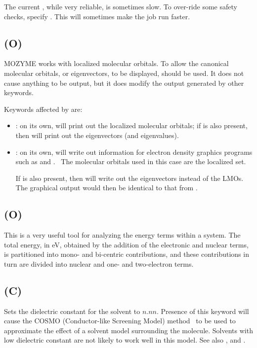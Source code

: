 The current , while very reliable, is sometimes slow.  To over-ride
some safety checks, specify .  This will sometimes make the job run
faster.

\subsection*{ (O)}

MOZYME works with localized molecular orbitals.  To allow the canonical
molecular orbitals, or eigenvectors, to be displayed,  should be
used. It does not cause anything to be output, but it does modify the output
generated by other keywords.

Keywords affected by 
are:
\begin{itemize}
\item {}: on its own,  will print out the localized
molecular orbitals; if  is also present, then 
will print out the eigenvectors (and eigenvalues).
\item  {}: on its own,  will write out information
for electron density graphics programs such as  and . \
The molecular orbitals used in this case are the localized set.

If  is also present, then  will write out the eigenvectors
instead of the LMOs.  The graphical output would then be identical to that
from \comp{MOPAC}.
\end{itemize}

\subsection*{ (O)}
This is a very useful tool for analyzing the energy terms  within  a
system.   The  total  energy,  in  eV,  obtained  by  the addition of the
electronic and nuclear terms, is partitioned into  mono-  and  bi-centric
contributions,  and  these contributions in turn are divided into nuclear
and one- and two-electron terms.


\subsection*{ (C)}
Sets the dielectric constant   for the solvent
to $n.nn$.  Presence of this keyword will cause the COSMO (Conductor-like
Screening Model) method~\cite{cosmo} to be used to approximate the effect of a
solvent model surrounding the molecule.  Solvents with low dielectric constant
are not likely to work well in this model.
See also , and .

